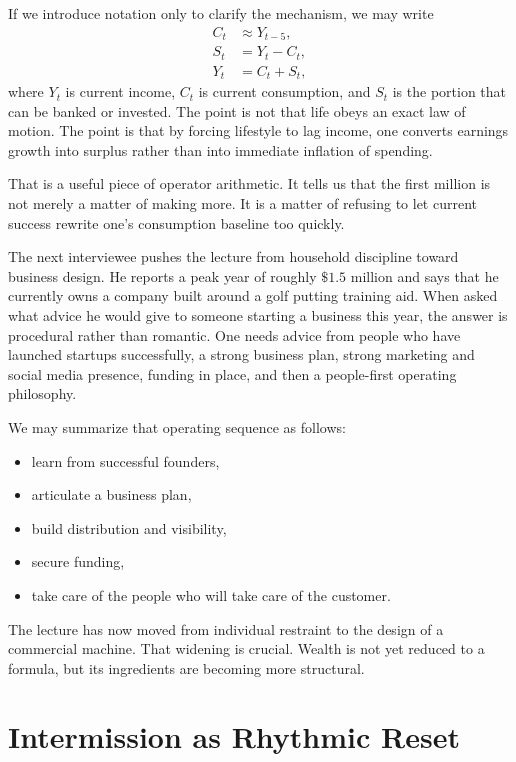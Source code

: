 If we introduce notation only to clarify the mechanism, we may write
\begin{align}
C_t &\approx Y_{t-5},\\
S_t &= Y_t - C_t,\\
Y_t &= C_t + S_t,
\end{align}
where \(Y_t\) is current income, \(C_t\) is current consumption, and \(S_t\) is the portion that can be banked or invested. The point is not that life obeys an exact law of motion. The point is that by forcing lifestyle to lag income, one converts earnings growth into surplus rather than into immediate inflation of spending.

That is a useful piece of operator arithmetic. It tells us that the first million is not merely a matter of making more. It is a matter of refusing to let current success rewrite one's consumption baseline too quickly.

The next interviewee pushes the lecture from household discipline toward business design. He reports a peak year of roughly \( \$1.5 \) million and says that he currently owns a company built around a golf putting training aid. When asked what advice he would give to someone starting a business this year, the answer is procedural rather than romantic. One needs advice from people who have launched startups successfully, a strong business plan, strong marketing and social media presence, funding in place, and then a people-first operating philosophy.

We may summarize that operating sequence as follows:
\begin{itemize}
\item learn from successful founders,
\item articulate a business plan,
\item build distribution and visibility,
\item secure funding,
\item take care of the people who will take care of the customer.
\end{itemize}

The lecture has now moved from individual restraint to the design of a commercial machine. That widening is crucial. Wealth is not yet reduced to a formula, but its ingredients are becoming more structural.

\section{Intermission as Rhythmic Reset}

